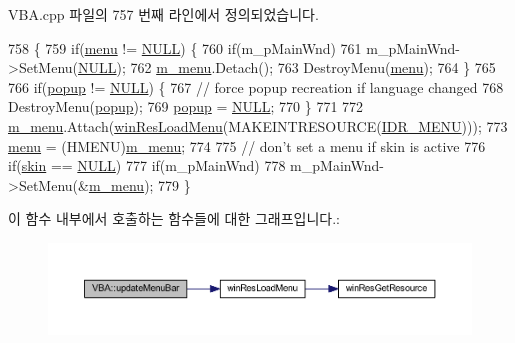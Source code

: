 V\+B\+A.\+cpp 파일의 757 번째 라인에서 정의되었습니다.


\begin{DoxyCode}
758 \{
759   \textcolor{keywordflow}{if}(\mbox{\hyperlink{class_v_b_a_acf9d855b5b959a2df9c6cb21b888366e}{menu}} != \mbox{\hyperlink{getopt1_8c_a070d2ce7b6bb7e5c05602aa8c308d0c4}{NULL}}) \{
760     \textcolor{keywordflow}{if}(m\_pMainWnd)
761       m\_pMainWnd->SetMenu(\mbox{\hyperlink{getopt1_8c_a070d2ce7b6bb7e5c05602aa8c308d0c4}{NULL}});
762     \mbox{\hyperlink{class_v_b_a_a7f2defb31b3597bac8b7e372b2b12fba}{m\_menu}}.Detach();
763     DestroyMenu(\mbox{\hyperlink{class_v_b_a_acf9d855b5b959a2df9c6cb21b888366e}{menu}});
764   \}
765 
766   \textcolor{keywordflow}{if}(\mbox{\hyperlink{class_v_b_a_ae9de0b5d432ad2e8a21faf040182fe03}{popup}} != \mbox{\hyperlink{getopt1_8c_a070d2ce7b6bb7e5c05602aa8c308d0c4}{NULL}}) \{
767     \textcolor{comment}{// force popup recreation if language changed}
768     DestroyMenu(\mbox{\hyperlink{class_v_b_a_ae9de0b5d432ad2e8a21faf040182fe03}{popup}});
769     \mbox{\hyperlink{class_v_b_a_ae9de0b5d432ad2e8a21faf040182fe03}{popup}} = \mbox{\hyperlink{getopt1_8c_a070d2ce7b6bb7e5c05602aa8c308d0c4}{NULL}};
770   \}
771 
772   \mbox{\hyperlink{class_v_b_a_a7f2defb31b3597bac8b7e372b2b12fba}{m\_menu}}.Attach(\mbox{\hyperlink{_win_res_util_8cpp_a455bea54e4ebdd67b568795f019b8d30}{winResLoadMenu}}(MAKEINTRESOURCE(\mbox{\hyperlink{resource_8h_a1df8e1e22d4ca57228ef934a2dda15bb}{IDR\_MENU}})));
773   \mbox{\hyperlink{class_v_b_a_acf9d855b5b959a2df9c6cb21b888366e}{menu}} = (HMENU)\mbox{\hyperlink{class_v_b_a_a7f2defb31b3597bac8b7e372b2b12fba}{m\_menu}};
774 
775   \textcolor{comment}{// don't set a menu if skin is active}
776   \textcolor{keywordflow}{if}(\mbox{\hyperlink{class_v_b_a_a2d80d3f19afa58047c05277aa0c18402}{skin}} == \mbox{\hyperlink{getopt1_8c_a070d2ce7b6bb7e5c05602aa8c308d0c4}{NULL}})
777     \textcolor{keywordflow}{if}(m\_pMainWnd)
778       m\_pMainWnd->SetMenu(&\mbox{\hyperlink{class_v_b_a_a7f2defb31b3597bac8b7e372b2b12fba}{m\_menu}});
779 \}
\end{DoxyCode}
이 함수 내부에서 호출하는 함수들에 대한 그래프입니다.\+:
\nopagebreak
\begin{figure}[H]
\begin{center}
\leavevmode
\includegraphics[width=350pt]{class_v_b_a_accf3451bad473b90400193636cd27c96_cgraph}
\end{center}
\end{figure}
